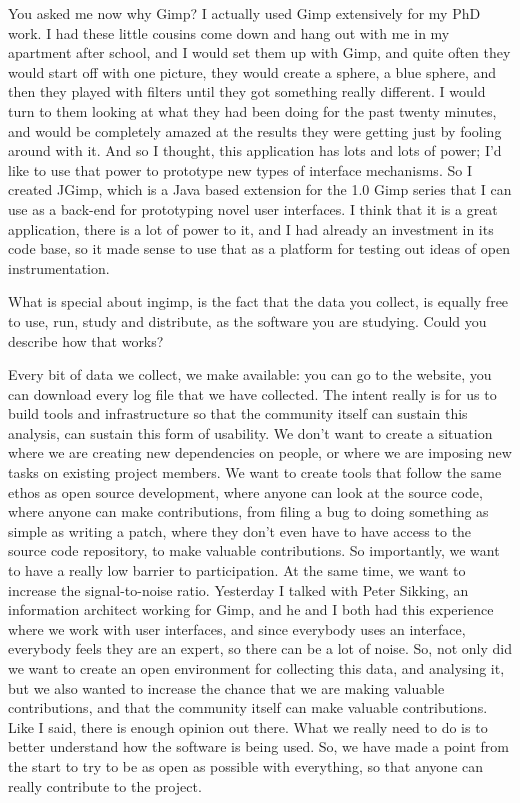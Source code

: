 {You asked me now why Gimp? I actually used Gimp extensively for my PhD
work. I had these little cousins come down and hang out with me in my
apartment after school, and I would set them up with Gimp, and quite
often they would start off with one picture, they would create a
sphere, a blue sphere, and then they played with filters until they got
something really different. I would turn to them looking at what they
had been doing for the past twenty minutes, and would be completely
amazed at the results they were getting just by fooling around with it.
And so I thought, this application has lots and lots of power;
I'd like to use that power to prototype new types of
interface mechanisms. So I created JGimp, which is a Java based
extension for the 1.0 Gimp series that I can use as a back{}-end for
prototyping novel user interfaces. I think that it is a great
application, there is a lot of power to it, and I had already an
investment in its code base, so it made sense to use that as a platform
for testing out ideas of open instrumentation.\par

 What is special about ingimp, is the fact that the data you
collect, is equally free to use, run, study and distribute, as the
software you are studying. Could you describe how that works?\par

 Every bit of data we collect, we make available: you can go to the
website, you can download every log file that we have collected. The
intent really is for us to build tools and infrastructure so that the
community itself can sustain this analysis, can sustain this form of
usability. We don't want to create a situation where we are creating
new dependencies on people, or where we are imposing new tasks on
existing project members. We want to create tools that follow the same
ethos as open source development, where anyone can look at the source
code, where anyone can make contributions, from filing a bug to doing
something as simple as writing a patch, where they don't even have to
have access to the source code repository, to make valuable
contributions. So importantly, we want to have a really low barrier to
participation. At the same time, we want to increase the
signal{}-to{}-noise ratio. Yesterday I talked with Peter Sikking, an
information architect working for Gimp, and he and I both had this
experience where we work with user interfaces, and since everybody uses
an interface, everybody feels they are an expert, so there can be a lot
of noise. So, not only did we want to create an open environment for
collecting this data, and analysing it, but we also wanted to increase
the chance that we are making valuable contributions, and that the
community itself can make valuable contributions. Like I said, there is
enough opinion out there. What we really need to do is to better
understand how the software is being used. So, we have made a point
from the start to try to be as open as possible with everything, so
that anyone can really contribute to the project.\par

}
